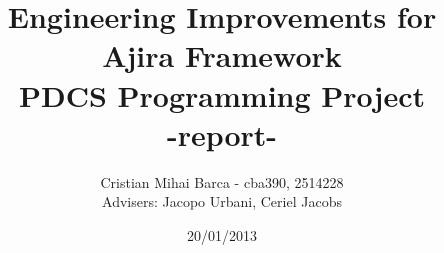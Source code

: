 \begin{titlepage}
\title{Engineering Improvements for \\ Ajira Framework \\ PDCS Programming Project  \\ -report-}
\author{Cristian Mihai Barca - cba390, 2514228 \\ Advisers: Jacopo Urbani, Ceriel Jacobs}
\date{20/01/2013}
\maketitle
\end{titlepage}

